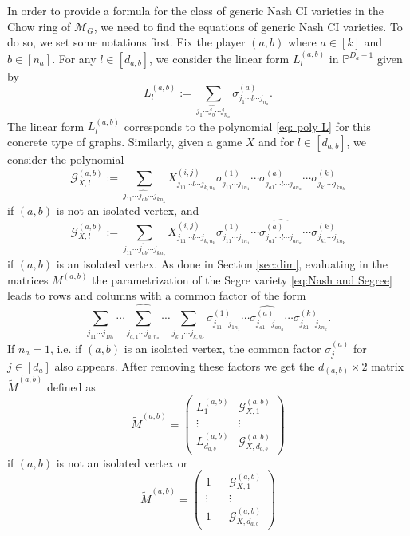 \documentclass[11pt]{amsart}
\numberwithin{equation}{section}
\theoremstyle{plain}
\numberwithin{theorem}{section}
\theoremstyle{definition}
\newcommand{\PP}{{\mathbb P}}
\begin{document}
In order to provide a formula for the class of  generic Nash CI varieties in the Chow ring of $\mathcal{M}_G$, we need to find the equations of generic Nash CI varieties.
To do so, we set some notations first. Fix the player $(a,b)$ where $a\in[k]$ and $b\in [n_a]$. For any $l\in[d_{a,b}]$, we consider the linear form $L_l^{(a,b)}$ in $\PP^{D_a-1}$ given by 
\[
\displaystyle L_l^{(a,b)}:= \sum_{j_1\cdots \hat{j_b}\cdots j_{n_a}} \sigma_{j_1\cdots l\cdots j_{n_a}}^{(a)}.
\]
The linear form $L_l^{(a,b)}$ corresponds to the polynomial \eqref{eq: poly L} for this concrete type of graphs.
Similarly, given a game $X$ and for $l\in[d_{a,b}]$, we consider the polynomial
\[
\mathcal G_{X,l}^{(a,b)}:=
\displaystyle \sum_{j_{11}\cdots\widehat{j_{ab}} \cdots j_{kn_k}}\!\!\!\!\! X^{(i,j)}_{j_{11}\cdots l\cdots j_{k,n_k}}\sigma^{(1)}_{j_{11}\cdots  j_{1n_1}}\cdots \sigma^{(a)}_{j_{a1}\cdots l\cdots j_{an_a}}\cdots \sigma^{(k)}_{j_{k1}\cdots  j_{kn_k}}
\]
if $(a,b)$ is not an isolated vertex, and
\[
\mathcal G_{X,l}^{(a,b)}:=
\displaystyle \sum_{j_{11}\cdots\widehat{j_{ab}} \cdots j_{kn_k}}\!\!\!\!\! X^{(i,j)}_{j_{11}\cdots l\cdots j_{k,n_k}}\sigma^{(1)}_{j_{11}\cdots  j_{1n_1}}\cdots \widehat{\sigma^{(a)}_{j_{a1}\cdots l\cdots j_{an_a}}}\cdots \sigma^{(k)}_{j_{k1}\cdots  j_{kn_k}}
\]
if $(a,b)$ is an isolated vertex.
As done in Section \ref{sec:dim}, evaluating in the matrices $M^{(a,b)}$ the parametrization of the Segre variety \eqref{eq:Nash and Segree} leads to rows and columns with a common factor of the form 
\[
\displaystyle\sum_{j_{11}\cdots j_{1n_1}}\cdots \widehat{\sum_{j_{a,1}\cdots j_{a,n_a}}}\cdots \sum_{j_{k,1}\cdots j_{k,n_k}}\sigma_{j_{11}\cdots j_{1n_1}}^{(1)}\cdots\widehat{\sigma_{j_{a1}\cdots j_{an_a}}^{(a)}} \cdots \sigma_{j_{k1}\cdots j_{kn_k}}^{(k)}.
\]
If $n_a=1$, i.e. if $(a,b)$ is an isolated vertex, the common factor $\sigma_j^{(a)}$ for $j\in[d_a]$ also appears. After removing these factors we get the $d_{(a,b)}\times 2$ matrix $\widetilde{M}^{(a,b)}$ defined as 
\[
\widetilde{M}^{(a,b)}=\begin{pmatrix}
    L_1^{(a,b)} & \mathcal G_{X,1}^{(a,b)}\\
\vdots &\vdots\\ 
    L_{d_{a,b}}^{(a,b)} & \mathcal G_{X,d_{a,b}}^{(a,b)}
\end{pmatrix}
\]
if $(a,b)$ is not an isolated vertex or 
\[
\widetilde{M}^{(a,b)}=\begin{pmatrix}
    1 && \mathcal G_{X,1}^{(a,b)}\\
\vdots &&\vdots\\ 
    1 && \mathcal G_{X,d_{a,b}}^{(a,b)}
\end{pmatrix}
\]
\end{document}
